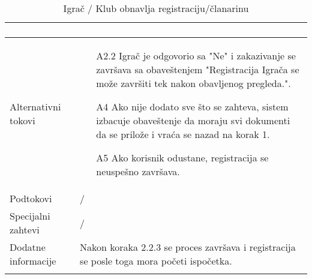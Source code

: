 \documentclass{article}
\begin{document}
\begin{longtable}{| p{} | p{} |}
\begin{enumerate}
                \end{enumerate}\\
            \hline
                Alternativni tokovi & 
                \begin{itemize}
                    \item[A2.2] Igrač je odgovorio sa "Ne" i zakazivanje se završava sa obaveštenjem "Registracija Igrača se može završiti tek nakon obavljenog pregleda.".
                    \item[A4] Ako nije dodato sve što se zahteva, sistem izbacuje obaveštenje da moraju svi dokumenti da se prilože i vraća se nazad na korak 1.
                    \item[A5] Ako korisnik odustane, registracija se neuspešno završava.
                \end{itemize}\\
            \hline
                Podtokovi & /\\
            \hline
                Specijalni zahtevi & /\\
            \hline
                Dodatne informacije & Nakon koraka 2.2.3 se proces završava i registracija se posle toga mora početi ispočetka. \\
            \hline
            \caption{Igrač / Klub obnavlja registraciju/članarinu}
        \end{longtable}
        
\end{document}
